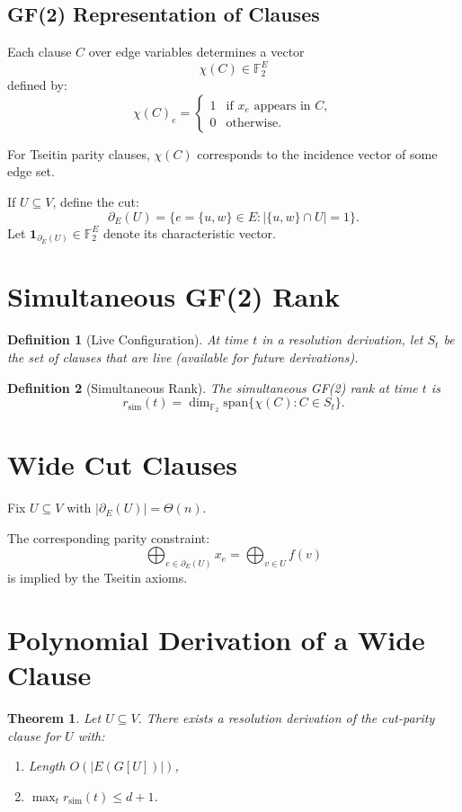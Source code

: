 \documentclass[11pt]{article}
\newtheorem{theorem}{Theorem}
\newtheorem{definition}{Definition}
\begin{document}
\subsection{GF(2) Representation of Clauses}

Each clause $C$ over edge variables determines a vector
\[
\chi(C) \in \mathbb{F}_2^{E}
\]
defined by:
\[
\chi(C)_e =
\begin{cases}
1 & \text{if } x_e \text{ appears in } C, \\
0 & \text{otherwise}.
\end{cases}
\]

For Tseitin parity clauses, $\chi(C)$ corresponds to the incidence vector of some edge set.

If $U\subseteq V$, define the cut:
\[
\partial_E(U) = \{ e=\{u,w\}\in E : |\{u,w\}\cap U|=1 \}.
\]
Let $\mathbf{1}_{\partial_E(U)} \in \mathbb{F}_2^E$ denote its characteristic vector.

\section{Simultaneous GF(2) Rank}

\begin{definition}[Live Configuration]
At time $t$ in a resolution derivation, let $S_t$ be the set of clauses that are live (available for future derivations).
\end{definition}

\begin{definition}[Simultaneous Rank]
The simultaneous GF(2) rank at time $t$ is
\[
r_{\mathrm{sim}}(t)
=
\dim_{\mathbb{F}_2}
\mathrm{span}
\{\chi(C) : C\in S_t\}.
\]
\end{definition}

\section{Wide Cut Clauses}

Fix $U\subseteq V$ with $|\partial_E(U)|=\Theta(n)$.

The corresponding parity constraint:
\[
\bigoplus_{e\in \partial_E(U)} x_e = \bigoplus_{v\in U} f(v)
\]
is implied by the Tseitin axioms.

\section{Polynomial Derivation of a Wide Clause}

\begin{theorem}
Let $U\subseteq V$.
There exists a resolution derivation of the cut-parity clause for $U$ with:
\begin{enumerate}[label=(\alph*)]
\item Length $O(|E(G[U])|)$,
\item $\max_t r_{\mathrm{sim}}(t) \le d+1$.
\end{enumerate}
\end{theorem}
\end{document}
